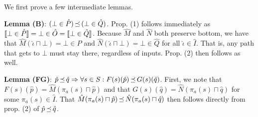 We first prove a few intermediate lemmas.

\textbf{Lemma (B)}: $(\bot \in \hat P) \operatorname{\mathrel{\preceq}} \, (\bot \in \hat Q)$. Prop. (1) follows immediately as $\llbracket\bot \in \hat P\rrbracket = \bot \in \hat O = \llbracket\bot \in \hat Q\rrbracket$. Because $\hat M$ and $\hat N$ both preserve bottom, we have that $\hat M(\hat \iota \sqcap \bot) = \bot \in \hat P$ and $\hat N(\hat \iota \sqcap \bot) = \bot \in \hat Q$ for all $\hat \iota \in \hat I$. That is, any path that gets to $\bot$ must stay there, regardless of inputs. Prop. (2) then follows as well.

\textbf{Lemma (FG)}: $\hat p \operatorname{\mathrel{\preceq}} \hat q \Rightarrow \forall s \in S : F(s)(\hat p) \operatorname{\mathrel{\preceq}} G(s)(\hat q)$. First, we note that $F(s)(\hat p) = \hat M(\pi_{a}(s) \sqcap \hat p)$ and that $G(s)(\hat q) = \hat N(\pi_{a}(s) \sqcap \hat q)$ for some $\pi_{a}(s) \in \hat I$. That $\hat M(\pi_{a}(s) \sqcap \hat p) \operatorname{\mathrel{\preceq}} \hat N(\pi_{a}(s) \sqcap \hat q)$ then follows directly from prop. (2) of $\hat p \operatorname{\mathrel{\preceq}} \hat q$.

